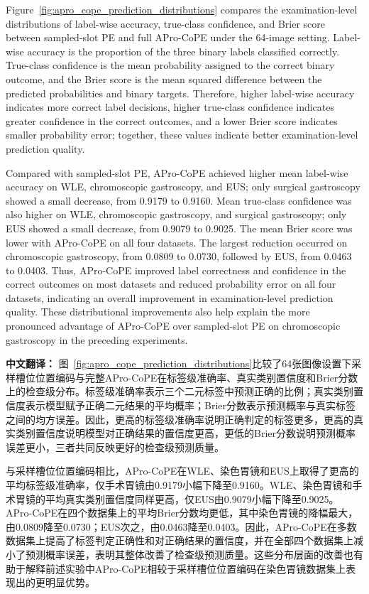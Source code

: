 \documentclass[Afour,sagev,times]{sagej}
\begin{document}
Figure~\ref{fig:apro_cope_prediction_distributions} compares the examination-level distributions of label-wise accuracy, true-class confidence, and Brier score between sampled-slot PE and full APro-CoPE under the 64-image setting. Label-wise accuracy is the proportion of the three binary labels classified correctly. True-class confidence is the mean probability assigned to the correct binary outcome, and the Brier score is the mean squared difference between the predicted probabilities and binary targets. Therefore, higher label-wise accuracy indicates more correct label decisions, higher true-class confidence indicates greater confidence in the correct outcomes, and a lower Brier score indicates smaller probability error; together, these values indicate better examination-level prediction quality.

Compared with sampled-slot PE, APro-CoPE achieved higher mean label-wise accuracy on WLE, chromoscopic gastroscopy, and EUS; only surgical gastroscopy showed a small decrease, from 0.9179 to 0.9160. Mean true-class confidence was also higher on WLE, chromoscopic gastroscopy, and surgical gastroscopy; only EUS showed a small decrease, from 0.9079 to 0.9025. The mean Brier score was lower with APro-CoPE on all four datasets. The largest reduction occurred on chromoscopic gastroscopy, from 0.0809 to 0.0730, followed by EUS, from 0.0463 to 0.0403. Thus, APro-CoPE improved label correctness and confidence in the correct outcomes on most datasets and reduced probability error on all four datasets, indicating an overall improvement in examination-level prediction quality. These distributional improvements also help explain the more pronounced advantage of APro-CoPE over sampled-slot PE on chromoscopic gastroscopy in the preceding experiments.

\textbf{中文翻译：} 图~\ref{fig:apro_cope_prediction_distributions}比较了64张图像设置下采样槽位位置编码与完整APro-CoPE在标签级准确率、真实类别置信度和Brier分数上的检查级分布。标签级准确率表示三个二元标签中预测正确的比例；真实类别置信度表示模型赋予正确二元结果的平均概率；Brier分数表示预测概率与真实标签之间的均方误差。因此，更高的标签级准确率说明正确判定的标签更多，更高的真实类别置信度说明模型对正确结果的置信度更高，更低的Brier分数说明预测概率误差更小，三者共同反映更好的检查级预测质量。

与采样槽位位置编码相比，APro-CoPE在WLE、染色胃镜和EUS上取得了更高的平均标签级准确率，仅手术胃镜由0.9179小幅下降至0.9160。WLE、染色胃镜和手术胃镜的平均真实类别置信度同样更高，仅EUS由0.9079小幅下降至0.9025。APro-CoPE在四个数据集上的平均Brier分数均更低，其中染色胃镜的降幅最大，由0.0809降至0.0730；EUS次之，由0.0463降至0.0403。因此，APro-CoPE在多数数据集上提高了标签判定正确性和对正确结果的置信度，并在全部四个数据集上减小了预测概率误差，表明其整体改善了检查级预测质量。这些分布层面的改善也有助于解释前述实验中APro-CoPE相较于采样槽位位置编码在染色胃镜数据集上表现出的更明显优势。
\end{document}

